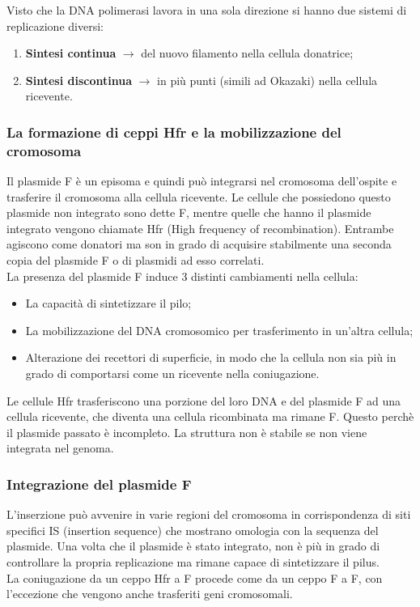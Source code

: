 Visto che la DNA polimerasi lavora in una sola direzione si hanno due sistemi di replicazione diversi:
\begin{enumerate}
    \item \textbf{Sintesi continua} $\xrightarrow{}$ del nuovo filamento nella cellula donatrice; 
    \item \textbf{Sintesi discontinua} $\xrightarrow{}$ in più punti (simili ad Okazaki) nella cellula ricevente. 
\end{enumerate}
\subsubsection{La formazione di ceppi Hfr e la mobilizzazione del cromosoma}
Il plasmide F è un episoma e quindi può integrarsi nel cromosoma dell'ospite e trasferire il cromosoma alla cellula ricevente. Le cellule che possiedono questo plasmide non integrato sono dette F\ap{+}, mentre quelle che hanno il plasmide integrato vengono chiamate Hfr (High frequency of recombination). Entrambe agiscono come donatori ma son in grado di acquisire stabilmente una seconda copia del plasmide F o di plasmidi ad esso correlati. 
\\La presenza del plasmide F induce 3 distinti cambiamenti nella cellula:
\begin{itemize}
    \item La capacità di sintetizzare il pilo; 
    \item La mobilizzazione del DNA cromosomico per trasferimento in un'altra cellula; 
    \item Alterazione dei recettori di superficie, in modo che la cellula non sia più in grado di comportarsi come un ricevente nella coniugazione. 
\end{itemize}
Le cellule Hfr trasferiscono una porzione del loro DNA e del plasmide F ad una cellula ricevente, che diventa una cellula ricombinata ma rimane F\ap{-}.
Questo perchè il plasmide passato è incompleto. La struttura non è stabile se non viene integrata nel genoma. 
\subsubsection{Integrazione del plasmide F}
L'inserzione può avvenire in varie regioni del cromosoma in corrispondenza di siti specifici IS (insertion sequence) che mostrano omologia con la sequenza del plasmide. Una volta che il plasmide è stato integrato, non è più in grado di controllare la propria replicazione ma rimane capace di sintetizzare il pilus.                     
\\La coniugazione da un ceppo Hfr a F\ap{-} procede come da un ceppo F\ap{+} a F\ap{-}, con l'eccezione che vengono anche trasferiti geni cromosomali. 
